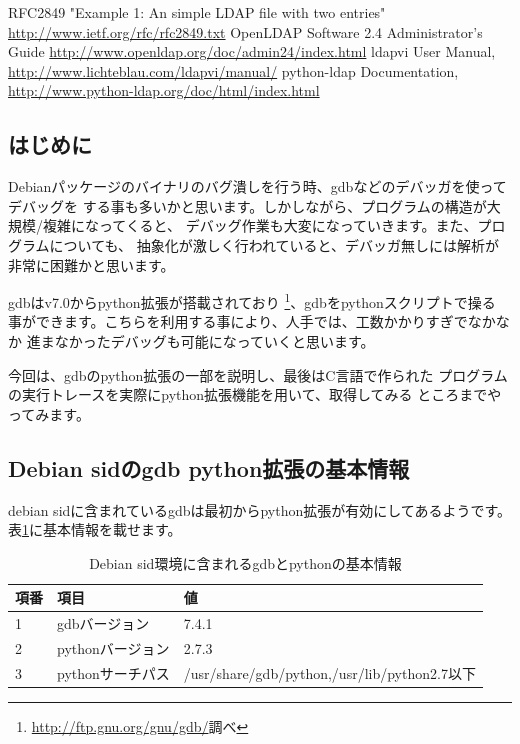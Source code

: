 \documentclass[mingoth,a4paper]{jsarticle}
\begin{document}
\begin{thebibliography}{0}
   RFC2849 "Example 1: An simple LDAP file with two entries" \url{http://www.ietf.org/rfc/rfc2849.txt}
   OpenLDAP Software 2.4 Administrator's Guide \url{http://www.openldap.org/doc/admin24/index.html}
   ldapvi User Manual, \url{http://www.lichteblau.com/ldapvi/manual/}
   python-ldap Documentation, \url{http://www.python-ldap.org/doc/html/index.html}
\end{thebibliography}


\subsection{はじめに}

 Debianパッケージのバイナリのバグ潰しを行う時、gdbなどのデバッガを使ってデバッグを
する事も多いかと思います。しかしながら、プログラムの構造が大規模/複雑になってくると、
デバッグ作業も大変になっていきます。また、プログラムについても、
抽象化が激しく行われていると、デバッガ無しには解析が非常に困難かと思います。

 gdbはv7.0からpython拡張が搭載されており
\footnote{\url{http://ftp.gnu.org/gnu/gdb/}調べ}、gdbをpythonスクリプトで操る
事ができます。こちらを利用する事により、人手では、工数かかりすぎでなかなか
進まなかったデバッグも可能になっていくと思います。

 今回は、gdbのpython拡張の一部を説明し、最後はC言語で作られた
プログラムの実行トレースを実際にpython拡張機能を用いて、取得してみる
ところまでやってみます。

\subsection{Debian sidのgdb python拡張の基本情報}

 debian sidに含まれているgdbは最初からpython拡張が有効にしてあるようです。
表\ref{tab:gdb-python-basic-info}に基本情報を載せます。

\begin{table}[ht]
\begin{center}
\small
\begin{tabular}{|l|l|l|}
\hline
項番 & 項目 & 値 \\
\hline
1 & gdbバージョン & 7.4.1 \\
2 & pythonバージョン & 2.7.3 \\
3 & pythonサーチパス & /usr/share/gdb/python,/usr/lib/python2.7以下 \\
\hline
\end{tabular}
\caption{Debian sid環境に含まれるgdbとpythonの基本情報}
\label{tab:gdb-python-basic-info}
\end{center}
\end{table}
\end{document}
